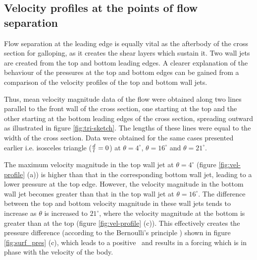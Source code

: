 \subsection{Velocity profiles at the points of flow separation}

Flow separation at the leading edge is equally vital as the afterbody of the cross section for galloping, as it creates the shear layers which sustain it. Two wall jets are created from the top and bottom leading edges. A clearer explanation of the behaviour of the pressures at the top and bottom edges can be gained from a comparison of the velocity profiles of the top and bottom wall jets.
 
 Thus, mean velocity magnitude data of the flow were obtained along two lines parallel to the front wall of the cross section, one starting at the top and the other starting at the bottom leading edges of the cross section, spreading outward as illustrated in figure \ref{fig:tri-sketch}. The lengths of these lines were equal to the width of the cross section. Data were obtained for the same cases presented earlier i.e. isosceles triangle ($\frac{d}{l}=0$) at $\theta=4^{\circ}$, $\theta=16^{\circ}$ and $\theta=21^{\circ}$.  






The maximum velocity magnitude in the top wall jet at $\theta= 4^{\circ}$ (figure \ref{fig:vel-profile} (a)) is higher than that in the corresponding bottom wall jet, leading to a lower pressure at the top edge. However, the velocity magnitude in the bottom wall jet becomes greater than that in the top wall jet at $\theta=16^{\circ}$. The difference between the top and bottom velocity magnitude in these wall jets tends to increase as $\theta$ is increased to $21^{\circ}$, where the velocity magnitude at the bottom is greater than at the top (figure \ref{fig:vel-profile} (c)). This effectively creates the pressure difference (according to the Bernoulli's principle ) shown in figure \ref{fig:surf_pres} (c), which leads to a positive \cy\ and results in a forcing which is in phase with the velocity of the body. 








